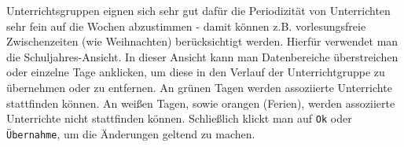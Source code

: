 \noindent
Unterrichtsgruppen eignen sich sehr gut dafür die Periodizität von Unterrichten sehr fein auf die Wochen abzustimmen - damit können z.B. vorlesungsfreie Zwischenzeiten (wie Weihnachten) berücksichtigt werden. Hierfür verwendet man die Schuljahres-Ansicht. In dieser Ansicht kann man Datenbereiche überstreichen oder einzelne Tage anklicken, um diese in den Verlauf der Unterrichtgruppe zu übernehmen oder zu entfernen. An grünen Tagen werden assoziierte Unterrichte stattfinden können. An weißen Tagen, sowie orangen (Ferien), werden assoziierte Unterrichte nicht stattfinden können. Schließlich klickt man auf \texttt{Ok} oder \texttt{Übernahme}, um die Änderungen geltend zu machen.\\





